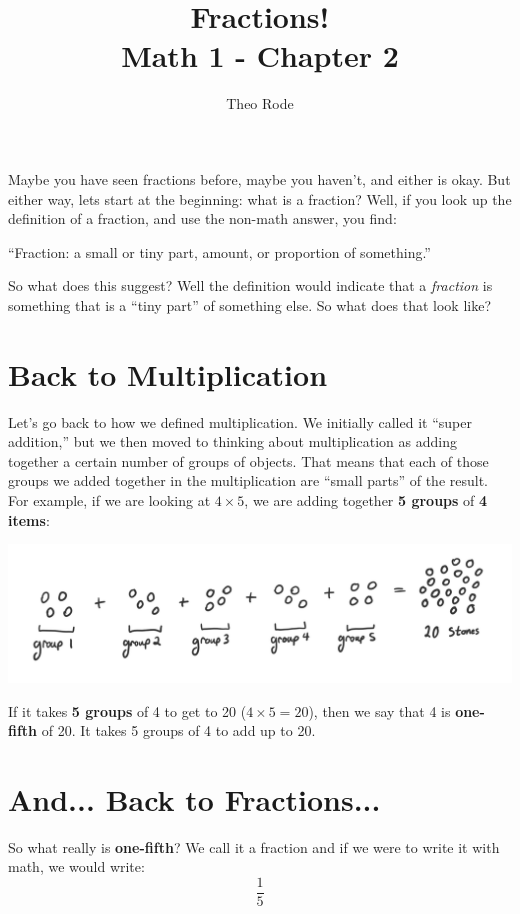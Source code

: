 \documentclass{article}
\title{\textbf{Fractions!} \\ \large Math 1 - Chapter 2}
\author{Theo Rode}
\date{}
\begin{document}
\maketitle

Maybe you have seen fractions before, maybe you haven't, and either is okay. But either way, lets start at the beginning: what is a fraction? Well, if you look up the definition of a fraction, and use the non-math answer, you find:
\begin{center}
    ``Fraction: a small or tiny part, amount, or proportion of something.''
\end{center}

So what does this suggest? Well the definition would indicate that a \textit{fraction} is something that is a ``tiny part'' of something else. So what does that look like? 

\section*{Back to Multiplication}

Let's go back to how we defined multiplication. We initially called it ``super addition,'' but we then moved to thinking about multiplication as adding together a certain number of groups of objects. That means that each of those groups we added together in the multiplication are ``small parts'' of the result. 
For example, if we are looking at $4 \times 5$, we are adding together \textbf{5 groups} of \textbf{4 items}:
\begin{center}
    \includegraphics[scale=0.5]{chapter2_draw1.png}
\end{center}
If it takes \textbf{5 groups} of 4 to get to 20 ($4 \times 5 = 20$), then we say that 4 is \textbf{one-fifth} of 20. It takes 5 groups of 4 to add up to 20. 

\section*{And... Back to Fractions...}

So what really is \textbf{one-fifth}? We call it a fraction and if we were to write it with math, we would write:
\[ \frac{1}{5} \]
\end{document}
